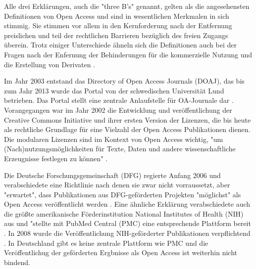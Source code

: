 Alle drei Erklärungen, auch die "three B's"\cite{suber_2004_praising_oa} genannt, gelten als die angesehensten Definitionen von Open Access und sind in wesentlichen Merkmalen in sich stimmig\cite{albert_2006_open_implications}. Sie stimmen vor allem in den Kernforderung nach der Entfernung preislichen und teil der rechtlichen Barrieren bezüglich des freien Zugangs überein. Trotz einiger Unterschiede ähneln sich die Definitionen auch bei der Fragen nach der Enfernung der Behinderungen für die kommerzielle Nutzung und die Erstellung von Derivaten  \cite{CREATe_2014}.

Im Jahr 2003 entstand das Directory of Open Access Journals (DOAJ), das bis zum Jahr 2013 wurde das Portal von der schwedischen Universität Lund betrieben. Das Portal stellt eine zentrale Anlaufstelle für OA-Journale dar \cite{suchen-Hoffmann-Zugang-undVerwertung-öffentlicher-Informationen}. Vorangegangen war im Jahr 2002 die Entwicklung und veröffentlichung der Creative Commons Initiative \cite{suchen-Hoffmann-Zugang-undVerwertung-öffentlicher-Informationen} und ihrer ersten Version der Lizenzen, die bis heute als rechtliche Grundlage für eine Vielzahl der Open Access Publikationen dienen\cite{suchen}. Die modularen Lizenzen sind im Kontext von Open Access wichtig, "um (Nach)nutzungsmöglichkeiten für Texte, Daten und andere wissenschaftliche Erzeugnisse festlegen zu können" \cite{suchen-Hoffmann-Zugang-undVerwertung-öffentlicher-Informationen}.

Die Deutsche Forschungsgemeinschaft (DFG) regierte Anfang 2006 und verabschiedete eine Richtlinie nach denen sie zwar nicht vorraussetzt, aber "erwartet", dass Publikationen aus DFG-geförderten Projekten "möglichst" als Open Access veröffentlicht werden \cite{suchen:dfg-richtlinie}. Eine ähnliche Erklärung verabschiedete auch die größte amerikanische Förderinstitution National Institutes of Health (NIH) aus und "stellte mit PubMed Central (PMC) eine entsprechende Plattform bereit \cite{muller_2010_open}. In 2008 wurde die Veröffentlichung NIH-geförderter Publikationen verpflichtend \cite{Hanekop_2014}. In Deutschland gibt es keine zentrale Plattform wie PMC und die Veröffentlichug der geförderten Ergbnisse als Open Access ist weiterhin nicht bindend.

